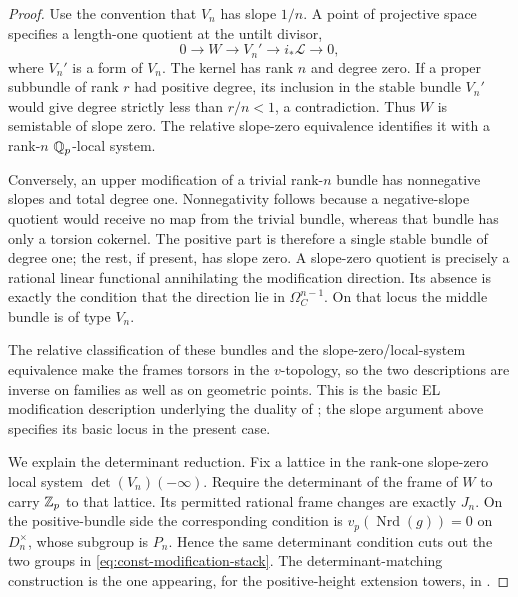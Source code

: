 \begin{proof}
Use the convention that $V_n$ has slope $1/n$.  A point of projective
space specifies a length-one quotient at the untilt divisor,
\[
 0\longrightarrow W\longrightarrow V_n'
          \longrightarrow i_*\mathcal L\longrightarrow0,
\]
where $V_n'$ is a form of $V_n$.  The kernel has rank $n$ and degree
zero.  If a proper subbundle of rank $r$ had positive degree, its
inclusion in the stable bundle $V_n'$ would give degree strictly less
than $r/n<1$, a contradiction.  Thus $W$ is semistable of slope zero.
The relative slope-zero equivalence identifies it with a rank-$n$
$\mathbb Q_p$-local system.

Conversely, an upper modification of a trivial rank-$n$ bundle has
nonnegative slopes and total degree one.  Nonnegativity follows because
a negative-slope quotient would receive no map from the trivial bundle,
whereas that bundle has only a torsion cokernel.  The positive part is
therefore a single stable bundle of degree one; the rest, if present,
has slope zero.  A slope-zero quotient is precisely a rational linear
functional annihilating the modification direction.  Its absence is
exactly the condition that the direction lie in $\Omega^{n-1}_C$.
On that locus the middle bundle is of type $V_n$.

The relative classification of these bundles and the slope-zero/local-system
equivalence make the frames torsors in the $v$-topology, so the two
descriptions are inverse on families as well as on geometric points.
This is the basic EL modification description underlying the duality
of \cite[Theorem~7.2.3]{ScholzeWeinstein}; the slope argument above
specifies its basic locus in the present case.

We explain the determinant reduction.  Fix a lattice in the rank-one
slope-zero local system
$\det(V_n)(-\infty)$.  Require the determinant of the frame of $W$ to
carry $\mathbb Z_p$ to that lattice.  Its permitted rational frame changes are
exactly $J_n$.  On the positive-bundle side the corresponding condition
is $v_p(\operatorname{Nrd}(g))=0$ on $D_n^{\times}$, whose subgroup is
$P_n$.  Hence the same determinant condition cuts out the two groups
in \eqref{eq:const-modification-stack}.  The determinant-matching
construction is the one appearing, for the positive-height extension
towers, in \cite[Theorem~2.0.1 and Theorem~2.6.3]{BMR}.


\end{proof}

